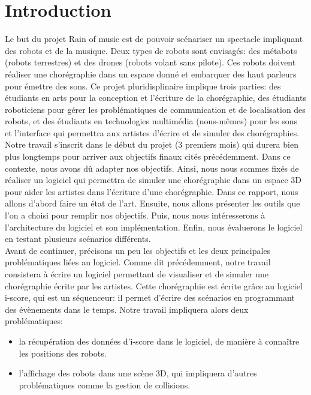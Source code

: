\section{Introduction}

Le but du projet Rain of music est de pouvoir scénariser un spectacle impliquant des robots et de la musique. Deux types de robots sont envisagés: des métabots (robots terrestres) et des drones (robots volant sans pilote). Ces robots doivent réaliser une chorégraphie dans un espace donné et embarquer des haut parleurs pour émettre des sons. Ce projet pluridisplinaire implique trois parties: des étudiants en arts pour la conception et l'écriture de la chorégraphie, des étudiants roboticiens pour gérer les problématiques de communication et de localisation des robots, et des étudiants en technologies multimédia (nous-mêmes) pour les sons et l'interface qui permettra aux artistes d'écrire et de simuler des chorégraphies. \\

Notre travail s'inscrit dans le début du projet (3 premiers mois) qui durera bien plus longtemps pour arriver aux objectifs finaux cités précédemment. Dans ce contexte, nous avons dû adapter nos objectifs. Ainsi, nous nous sommes fixés de réaliser un logiciel qui permettra de simuler une chorégraphie dans un espace 3D pour aider les artistes dans l'écriture d'une chorégraphie. Dans ce rapport, nous allons d'abord faire un état de l'art. Ensuite, nous allons présenter les outils que l'on a choisi pour remplir nos objectifs. Puis, nous nous intéresserons à l'architecture du logiciel et son implémentation. Enfin, nous évaluerons le logiciel en testant plusieurs scénarios différents. \\

Avant de continuer, précisons un peu les objectifs et les deux principales problématiques liées au logiciel.
Comme dit précédemment, notre travail consistera à écrire un logiciel permettant de visualiser et de simuler une chorégraphie écrite par les artistes. Cette chorégraphie est écrite grâce au logiciel i-score, qui est un séquenceur: il permet d'écrire des scénarios en programmant des évènements dans le temps. Notre travail impliquera alors deux problématiques: 
\begin{itemize}
\item la récupération des données d'i-score dans le logiciel, de manière à connaître les positions des robots.
\item l'affichage des robots dans une scène 3D, qui impliquera d'autres problématiques comme la gestion de collisions.
\end{itemize} 
